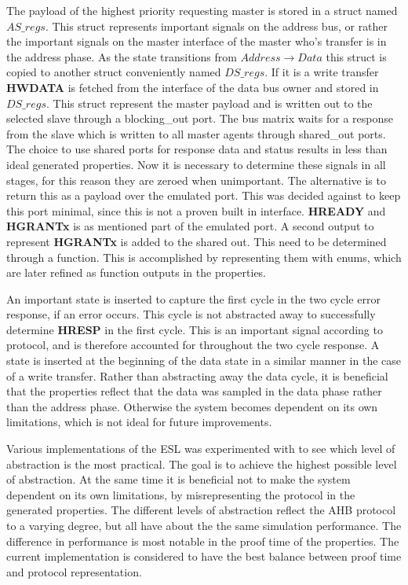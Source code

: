 The payload of the highest priority requesting master is stored in a struct named $AS\_regs$. This struct represents important signals on the address bus, or rather the important signals on the master interface of the master who's transfer is in the address phase. As the state transitions from $Address\rightarrow Data$ this struct is copied to another struct conveniently named $DS\_regs$. If it is a write transfer \textbf{HWDATA} is fetched from the interface of the data bus owner and stored in $DS\_regs$. This struct represent the master payload and is written out to the selected slave through a blocking\_out port. The bus matrix waits for a response from the slave which is written to all master agents through shared\_out ports. The choice to use shared ports for response data and status results in less than ideal generated properties. Now it is necessary to determine these signals in all stages, for this reason they are zeroed when unimportant. The alternative is to return this as a payload over the emulated port. This was decided against to keep this port minimal, since this is not a proven built in interface. \textbf{HREADY} and \textbf{HGRANTx} is as mentioned part of the emulated port. A second output to represent \textbf{HGRANTx} is added to the shared out. This need to be determined through a function. This is accomplished by representing them with enums, which are later refined as function outputs in the properties. \par 
An important state is inserted to capture the first cycle in the two cycle error response, if an error occurs. This cycle is not abstracted away to successfully determine \textbf{HRESP} in the first cycle. This is an important signal according to protocol, and is therefore accounted for throughout the two cycle response. A state is inserted at the beginning of the data state in a similar manner in the case of a write transfer. Rather than abstracting away the data cycle, it is beneficial that the properties reflect that the data was sampled in the data phase rather than the address phase. Otherwise the system becomes dependent on its own limitations, which is not ideal for future improvements. \par
Various implementations of the ESL was experimented with to see which level of abstraction is the most practical. The goal is to achieve the highest possible level of abstraction. At the same time it is beneficial not to make the system dependent on its own limitations, by misrepresenting the protocol in the generated properties. The different levels of abstraction reflect the AHB protocol to a varying degree, but all have about the the same simulation performance. The difference in performance is most notable in the proof time of the properties. The current implementation is considered to have the best balance between proof time and protocol representation.       


